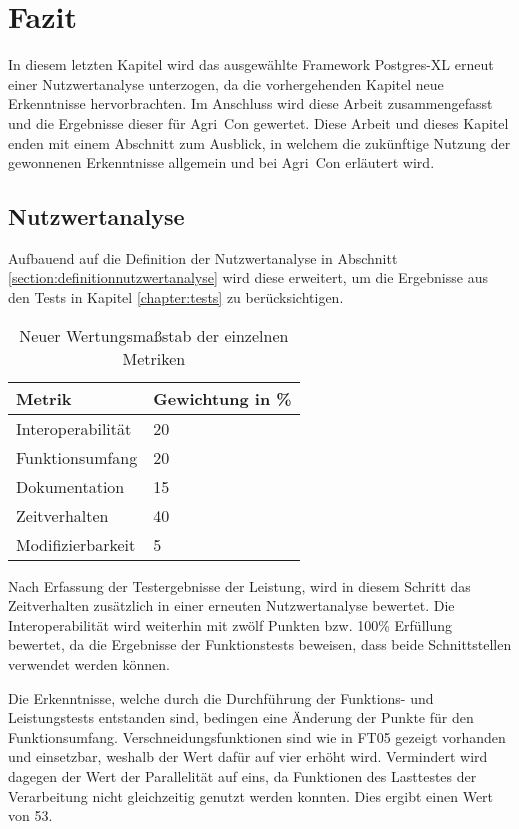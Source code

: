 \chapter{Fazit}
\label{chapter:fazit}
In diesem letzten Kapitel wird das ausgewählte Framework Postgres-XL erneut einer Nutzwertanalyse unterzogen, da die vorhergehenden Kapitel neue Erkenntnisse hervorbrachten.
Im Anschluss wird diese Arbeit zusammengefasst und die Ergebnisse dieser für Agri~Con gewertet.
Diese Arbeit und dieses Kapitel enden mit einem Abschnitt zum Ausblick, in welchem die zukünftige Nutzung der gewonnenen Erkenntnisse allgemein und bei Agri~Con erläutert wird.

\section{Nutzwertanalyse}%
Aufbauend auf die Definition der Nutzwertanalyse in Abschnitt \ref{section:definitionnutzwertanalyse} wird diese erweitert, um die Ergebnisse aus den Tests in Kapitel \ref{chapter:tests} zu berücksichtigen.

\begin{table}[h!]
\centering
\begin{tabular}{|l|l|}
\hline
\textbf{Metrik} & \textbf{Gewichtung in \%} \\ \hline
Interoperabilität & 20 \\ \hline
Funktionsumfang & 20 \\ \hline
Dokumentation & 15 \\ \hline
Zeitverhalten & 40 \\ \hline
Modifizierbarkeit & 5 \\ \hline
\end{tabular}
\caption{Neuer Wertungsmaßstab der einzelnen Metriken}
\label{table:Wertungsmassstab2}
\end{table}
Nach Erfassung der Testergebnisse der Leistung, wird in diesem Schritt das Zeitverhalten zusätzlich in einer erneuten Nutzwertanalyse bewertet.
Die Interoperabilität wird weiterhin mit zwölf Punkten bzw. 100\%{} Erfüllung bewertet, da die Ergebnisse der Funktionstests beweisen, dass beide Schnittstellen verwendet werden können.

Die Erkenntnisse, welche durch die Durchführung der Funktions- und Leistungstests entstanden sind, bedingen eine Änderung der Punkte für den Funktionsumfang.
Verschneidungsfunktionen sind wie in FT05 gezeigt vorhanden und einsetzbar, weshalb der Wert dafür auf vier erhöht wird.
Vermindert wird dagegen der Wert der Parallelität auf eins, da Funktionen des Lasttestes der Verarbeitung nicht gleichzeitig genutzt werden konnten.
Dies ergibt einen Wert von 53.

